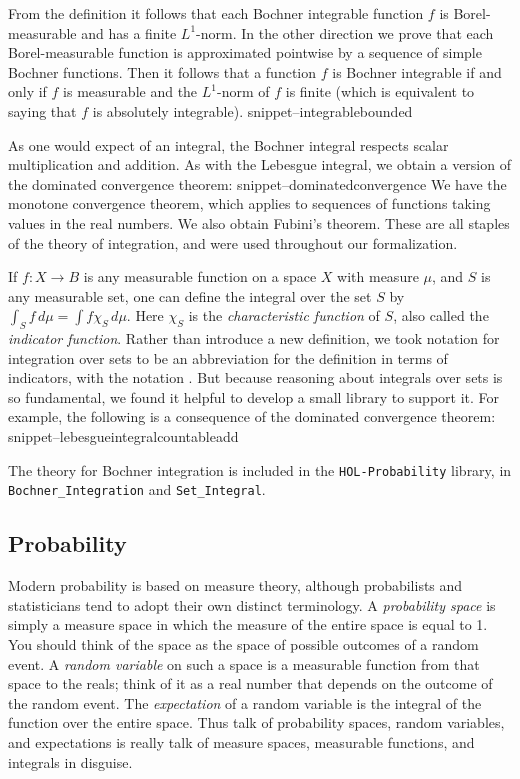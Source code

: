 \documentclass{svjour3}
\newcommand{\Snippet}[1]{\csname snippet--#1\endcsname}
\begin{document}
From the definition it follows that each Bochner integrable function $f$ is Borel-measurable and has a finite $L^1$-norm. In the other direction we prove that each Borel-measurable function is approximated pointwise by a sequence of simple Bochner functions. Then it follows that a function $f$ is Bochner integrable if and only if $f$ is measurable and the $L^1$-norm of $f$ is finite (which is equivalent to saying that $f$ is absolutely integrable).
\Snippet{integrablebounded}

As one would expect of an integral, the Bochner integral respects scalar multiplication and addition. As with the Lebesgue integral, we obtain a version of the dominated convergence theorem:
\Snippet{dominatedconvergence}
We have the monotone convergence theorem, which applies to sequences of functions taking values in the real numbers. We also obtain Fubini's theorem. These are all staples of the theory of integration, and were used throughout our formalization.

If $f : X \to B$ is any measurable function on a space $X$ with measure $\mu$, and $S$ is any measurable set, one can define the integral over the set $S$ by $\int_S f \, d\mu = \int f \chi_S \, d\mu$. Here $\chi_S$ is the \emph{characteristic function} of $S$, also called the \emph{indicator function}. Rather than introduce a new definition, we took notation for integration over sets to be an abbreviation for the definition in terms of indicators, with the notation . But because reasoning about integrals over sets is so fundamental, we found it helpful to develop a small library to support it. For example, the following is a consequence of the dominated convergence theorem:
\Snippet{lebesgueintegralcountableadd}

The theory for Bochner integration is included in the \texttt{HOL-Probability} library, in \texttt{Bochner\_Integration} and \texttt{Set\_Integral}.

\subsection{Probability}
\label{subsection:probability}

Modern probability is based on measure theory, although probabilists and statisticians tend to adopt their own distinct terminology. A \emph{probability space} is simply a measure space in which the measure of the entire space is equal to 1. You should think of the space as the space of possible outcomes of a random event. A \emph{random variable} on such a space is a measurable function from that space to the reals; think of it as a real number that depends on the outcome of the random event. The \emph{expectation} of a random variable is the integral of the function over the entire space. Thus talk of probability spaces, random variables, and expectations is really talk of measure spaces, measurable functions, and integrals in disguise.
\end{document}
